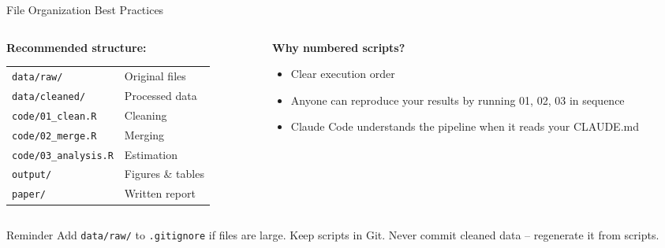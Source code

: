 \begin{frame}{File Organization Best Practices}
  \begin{columns}[T]
    \begin{column}{0.47\textwidth}
      \textbf{Recommended structure:}

      \vspace{4pt}

      \small
      \begin{tabular}{@{}ll@{}}
        \texttt{data/raw/}     & Original files \\
        \texttt{data/cleaned/} & Processed data \\
        \texttt{code/01\_clean.R}  & Cleaning \\
        \texttt{code/02\_merge.R}  & Merging \\
        \texttt{code/03\_analysis.R} & Estimation \\
        \texttt{output/}       & Figures \& tables \\
        \texttt{paper/}        & Written report \\
      \end{tabular}
    \end{column}
    \begin{column}{0.47\textwidth}
      \textbf{Why numbered scripts?}
      \begin{itemize}
        \item Clear execution order
        \item Anyone can reproduce your results by running 01, 02, 03 in sequence
        \item Claude Code understands the pipeline when it reads your CLAUDE.md
      \end{itemize}
    \end{column}
  \end{columns}

  \vspace{8pt}

  \begin{block}{Reminder}
    Add \texttt{data/raw/} to \texttt{.gitignore} if files are large.
    Keep scripts in Git. Never commit cleaned data -- regenerate it from scripts.
  \end{block}
\end{frame}


